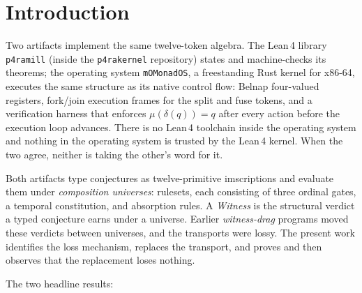 \documentclass[12pt,a4paper]{article}
\newcommand{\Lean}{\textsf{Lean}\,4}
\begin{document}
\tableofcontents

\section{Introduction}

Two artifacts implement the same twelve-token algebra. The \Lean{} library
\texttt{p4ramill} (inside the \texttt{p4rakernel} repository) states and
machine-checks its theorems; the operating system \texttt{mOMonadOS}, a
freestanding Rust kernel for x86-64, executes the same structure as its
native control flow: Belnap four-valued registers, fork/join execution
frames for the split and fuse tokens, and a verification harness that
enforces $\mu(\delta(q)) = q$ after every action before the execution loop
advances. There is no \Lean{} toolchain inside the operating system and
nothing in the operating system is trusted by the \Lean{} kernel. When the
two agree, neither is taking the other's word for it.

Both artifacts type conjectures as twelve-primitive imscriptions and evaluate
them under \emph{composition universes}: rulesets, each consisting of three
ordinal gates, a temporal constitution, and absorption rules. A
\emph{Witness} is the structural verdict a typed conjecture earns under a
universe. Earlier \emph{witness-drag} programs moved these verdicts between
universes, and the transports were lossy. The present work identifies the
loss mechanism, replaces the transport, and proves and then observes that
the replacement loses nothing.

The two headline results:
\end{document}
